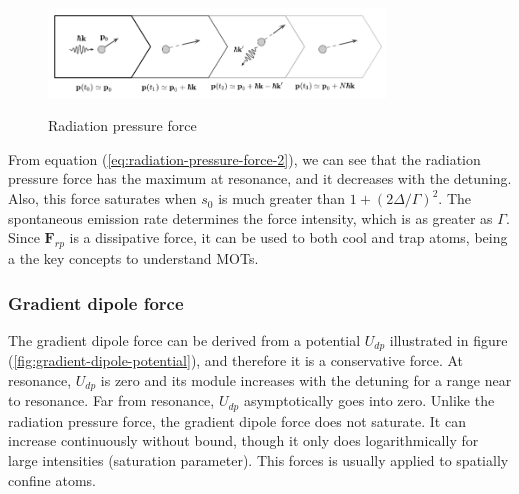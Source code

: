 {\begin{figure}[!ht]
	\centering
	\caption{Radiation pressure force}
	\vspace{-10pt}
	\includegraphics[width=0.8\textwidth]{USPSC-img/radiation_pressure_force.png}
	\vspace{5pt}
	\label{fig:radiation-pressure-force}
	\vspace{-15pt}
\end{figure}

From equation (\ref{eq:radiation-pressure-force-2}), we can see that the radiation pressure force has the maximum at resonance, and it decreases with the detuning. Also, this force saturates when $ s_0 $ is much greater than $ 1 + (2\Delta / \Gamma)^2 $. The spontaneous emission rate determines the force intensity, which is as greater as $ \Gamma $. Since $ \mathbf{F}_{rp} $ is a dissipative force, it can be used to both cool and trap atoms, being a the key concepts to understand MOTs.

\subsubsection{Gradient dipole force}
\label{sec:gradient-dipole-force}

The gradient dipole force can be derived from a potential $ U_{dp} $ illustrated in figure (\ref{fig:gradient-dipole-potential}), and therefore it is a conservative force. At resonance, $ U_{dp} $ is zero and its module increases with the detuning for a range near to resonance. Far from resonance, $ U_{dp} $ asymptotically goes into zero. Unlike the radiation pressure force, the gradient dipole force does not saturate. It can increase continuously without bound, though it only does logarithmically for large intensities (saturation parameter). This forces is usually applied to spatially confine atoms.

}
